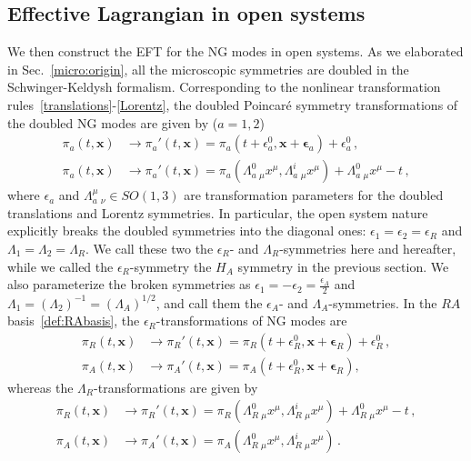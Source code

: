 \documentclass[a4paper,11pt]{article}
\begin{document}
\subsection{Effective Lagrangian in open systems}
\label{subsec:EFT_const}

We then construct the EFT for the NG modes in open systems. As we elaborated in Sec.~\ref{micro:origin}, all the microscopic symmetries are doubled in the Schwinger-Keldysh formalism. Corresponding to the nonlinear transformation rules~\eqref{translations}-\eqref{Lorentz}, the doubled Poincar\'e symmetry transformations of the doubled NG modes are given by ($a=1,2$)
\begin{align}
\label{pi_a_translations}
 \pi_a(t,\mathbf{x})
 &\to \pi_a'(t,\mathbf{x})
 = \pi_a\left(t+\epsilon^0_a,\mathbf{x}+\boldsymbol{\epsilon}_a\right)+\epsilon^0_a\,,
\\
\pi_a(t,\mathbf{x})
 &\to \pi_a' (t,\mathbf{x}) 
 = \pi_a \left(\Lambda_a^0\,{}_\mu x^\mu,\Lambda_a^i\,{}_\mu x^\mu\right)+\Lambda_a^0\,{}_\mu x^\mu-t
\,,
\end{align}
where $\epsilon_a$ and $\Lambda_a^\mu\,{}_\nu\in SO(1,3)$ are transformation parameters for the doubled translations and Lorentz symmetries. 
In particular, the open system nature explicitly breaks the doubled symmetries into the diagonal ones: $\epsilon_1=\epsilon_2=\epsilon_R$ and $\Lambda_1=\Lambda_2=\Lambda_R$.
We call these two the $\epsilon_R$- and $\Lambda_R$-symmetries here and hereafter, while we called the $\epsilon_R$-symmetry the $H_A$ symmetry in the previous section. We also parameterize the broken symmetries as $\displaystyle\epsilon_1=-\epsilon_2=\frac{\epsilon_A}{2}$ and $\Lambda_1=(\Lambda_2)^{-1}=(\Lambda_A)^{1/2}$, and call them the $\epsilon_A$- and $\Lambda_A$-symmetries.
In the $RA$ basis~\eqref{def:RAbasis}, the $\epsilon_R$-transformations of NG modes are
\begin{align}
\label{R_translations_R}
 \pi_R(t,\mathbf{x})
 &\to \pi_R'(t,\mathbf{x})
 = \pi_R\left(t+\epsilon^0_R,\mathbf{x}+\boldsymbol{\epsilon}_R\right)+\epsilon^0_R\,,
\\
\label{R_translations_A}
  \pi_A(t,\mathbf{x})
 &\to \pi_A'(t,\mathbf{x})
 = \pi_A\left(t+\epsilon^0_R,\mathbf{x}+\boldsymbol{\epsilon}_R\right),
\end{align}
whereas the $\Lambda_R$-transformations are  given by
\begin{align}
\label{R_Lorentz_R}
\pi_R(t,\mathbf{x})
 &\to \pi_R' (t,\mathbf{x}) 
 = \pi_R \left(\Lambda_R^0\,{}_\mu x^\mu,\Lambda_R^i\,{}_\mu x^\mu\right)+\Lambda_R^0\,{}_\mu x^\mu-t\,,
 \\
\label{R_Lorentz_A}
 \pi_A(t,\mathbf{x})
 &\to \pi_A' (t,\mathbf{x}) 
 = \pi_A \left(\Lambda_R^0\,{}_\mu x^\mu,\Lambda_R^i\,{}_\mu x^\mu\right)\,.
\end{align}
\end{document}

